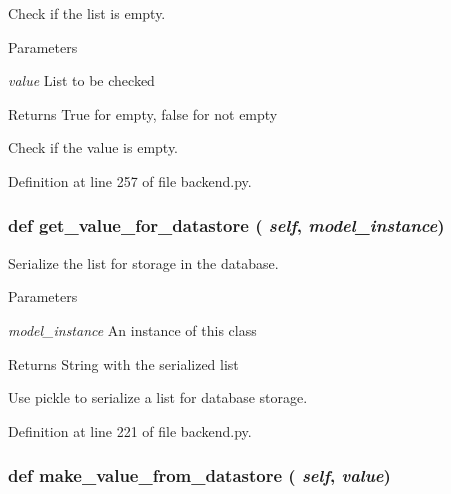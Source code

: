 Check if the list is empty. 
\begin{DoxyParams}{Parameters}
\item[{\em value}]List to be checked \end{DoxyParams}
\begin{DoxyReturn}{Returns}
True for empty, false for not empty\begin{DoxyVerb}Check if the value is empty.\end{DoxyVerb}
 
\end{DoxyReturn}


Definition at line 257 of file backend.py.\hypertarget{classbackend_1_1_generic_list_property_a54cc138e6df3ad55c38fa5db72327963}{
\subsubsection[{get\_\-value\_\-for\_\-datastore}]{\setlength{\rightskip}{0pt plus 5cm}def get\_\-value\_\-for\_\-datastore ( {\em self}, \/   {\em model\_\-instance})}}
\label{classbackend_1_1_generic_list_property_a54cc138e6df3ad55c38fa5db72327963}


Serialize the list for storage in the database. 
\begin{DoxyParams}{Parameters}
\item[{\em model\_\-instance}]An instance of this class \end{DoxyParams}
\begin{DoxyReturn}{Returns}
String with the serialized list\begin{DoxyVerb}Use pickle to serialize a list for database storage.\end{DoxyVerb}
 
\end{DoxyReturn}


Definition at line 221 of file backend.py.\hypertarget{classbackend_1_1_generic_list_property_a464c5a5f52df989128b5fc067ea34512}{
\subsubsection[{make\_\-value\_\-from\_\-datastore}]{\setlength{\rightskip}{0pt plus 5cm}def make\_\-value\_\-from\_\-datastore ( {\em self}, \/   {\em value})}}
\label{classbackend_1_1_generic_list_property_a464c5a5f52df989128b5fc067ea34512}


